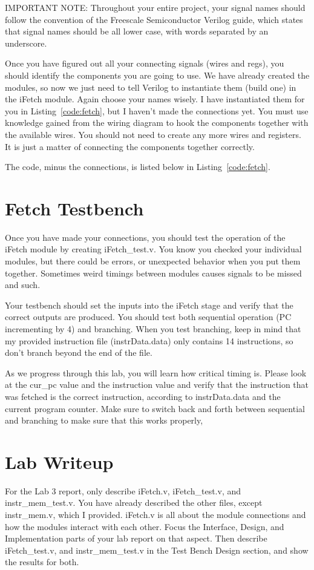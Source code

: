 IMPORTANT NOTE: Throughout your entire project, your signal names should follow the convention of the Freescale Semiconductor Verilog guide, which states that signal names should be all lower case, with words separated by an underscore.   

Once you have figured out all your connecting signals (wires and regs), you should identify the components you are going to use.  We have already created the modules, so now we just need to tell Verilog to instantiate them (build one) in the iFetch module.  Again choose your names wisely.  I have instantiated them for you in Listing~\ref{code:fetch}, but I haven't made the connections yet.  You must use knowledge gained from the wiring diagram to hook the components together with the available wires.  You should not need to create any more wires and registers.  It is just a matter of connecting the components together correctly.

The code, minus the connections, is listed below in Listing~\ref{code:fetch}.    


\section{Fetch Testbench}
Once you have made your connections, you should test the operation of the iFetch module by creating iFetch\_test.v.  You know you checked your individual modules, but there could be errors, or unexpected behavior when you put them together.  Sometimes weird timings between modules causes signals to be missed and such.  

Your testbench should set the inputs into the iFetch stage and verify that the correct outputs are produced. You should test both sequential operation (PC incrementing by 4) and branching.  When you test branching, keep in mind that my provided instruction file (instrData.data) only contains 14 instructions, so don't branch beyond the end of the file.

As we progress through this lab, you will learn how critical timing is.  Please look at the cur\_pc value and the instruction value and verify that the instruction that was fetched is the correct instruction, according to instrData.data and the current program counter.  Make sure to switch back and forth between sequential and branching to make sure that this works properly, 

\section{Lab Writeup}
For the Lab 3 report, only describe iFetch.v, iFetch\_test.v, and instr\_mem\_test.v.  You have already described the other files, except instr\_mem.v, which I provided.  iFetch.v is all about the module connections and how the modules interact with each other.  Focus the Interface, Design, and Implementation parts of your lab report on that aspect.  Then describe iFetch\_test.v, and instr\_mem\_test.v in the Test Bench Design section, and show the results for both.


